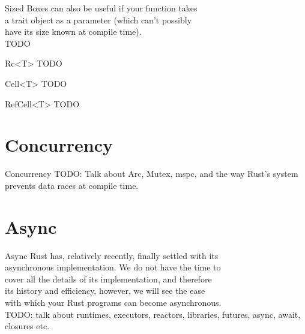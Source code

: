 \documentclass[usenames,dvipsnames,10pt,aspectratio=169]{beamer}
\begin{document}
\begin{frame}{Sized}
	Boxes can also be useful if your function takes\\
	a trait object as a parameter (which can't possibly\\
	have its size known at compile time).\\
	\textcolor{ucured}{TODO}
\end{frame}

\begin{frame}{Rc<T>}
	\large
	\textcolor{ucured}{TODO}
\end{frame}

\begin{frame}{Cell<T>}
	\large
	\textcolor{ucured}{TODO}
\end{frame}

\begin{frame}{RefCell<T>}
	\large
	\textcolor{ucured}{TODO}
\end{frame}


\section{Concurrency}

\begin{frame}{Concurrency}
	\large
	\textcolor{ucured}{TODO: Talk about Arc, Mutex,
	mspc, and the way Rust's system prevents data races at compile
time.}
\end{frame}


\section{Async}

\begin{frame}{Async}
	\large
	Rust has, relatively recently, finally settled with its\\
	asynchronous implementation. We do not have the time to\\
	cover all the details of its implementation, and therefore\\
	its history and efficiency, however, we will see the ease\\
	with which your Rust programs can become asynchronous.\\
	\textcolor{ucured}{TODO: talk about runtimes, executors,
	reactors, libraries, futures, async, await, closures etc.}
	
\end{frame}
\end{document}
